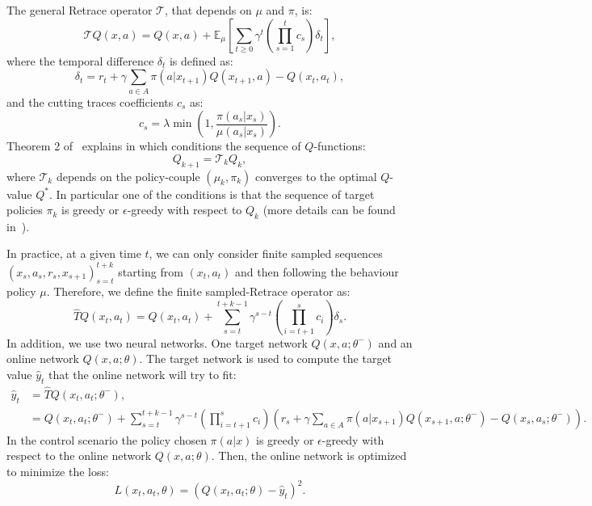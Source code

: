 \documentclass{article} %
\begin{document}
The general Retrace operator $\mathcal{T}$, that depends on $\mu$ and $\pi$, is:
\begin{equation}
\mathcal{T}Q(x,a) = Q(x,a) + \mathbb{E}_{\mu}\left[\sum_{t\geq0}\gamma^t\left(\prod_{s=1}^tc_s\right)\delta_t \right],
\end{equation}
where the temporal difference $\delta_t$ is defined as:
\begin{equation}
\delta_t = r_t + \gamma \sum_{a\in A}\pi(a|x_{t+1})Q(x_{t+1},a)-Q(x_t, a_t),    
\end{equation}
and the cutting traces coefficients $c_s$ as:
\begin{equation}
c_s = \lambda\min\left(1, \frac{\pi(a_s|x_s)}{\mu(a_s|x_s)}\right).    
\end{equation}
Theorem 2 of~\citet{munos2016safe} explains in which conditions the sequence of $Q$-functions:
\begin{equation}
    Q_{k+1} = \mathcal{T}_k Q_k,
\end{equation}
where $\mathcal{T}_k$ depends on the policy-couple $(\mu_k, \pi_k)$ converges to the optimal $Q$-value $Q^*$. In particular one of the conditions is that the sequence of target policies $\pi_k$ is greedy or $\epsilon$-greedy with respect to $Q_k$ (more details can be found in~\citet{munos2016safe}).

In practice, at a given time $t$, we can only consider finite sampled sequences $(x_s, a_s, r_s, x_{s+1})_{s=t}^{t+k}$ starting from $(x_t, a_t)$ and then following the behaviour policy $\mu$. Therefore, we define the finite sampled-Retrace operator as:
\begin{equation}
    \hat{T}Q(x_t, a_t) = Q(x_t, a_t) + \sum_{s=t}^{t+k-1}\gamma^{s-t}\left(\prod_{i=t+1}^s c_i\right)\delta_s.
\end{equation}
In addition, we use two neural networks. One target network $Q(x,a;\theta^-)$ and an online network $Q(x,a;\theta)$. The target network is used to compute the target value $\hat{y}_t$ that the online network will try to fit:
\begin{align}
\hat{y}_t &= \hat{T}Q(x_t, a_t; \theta^-),
\\
&= Q(x_t, a_t; \theta^-) + \sum_{s=t}^{t+k-1}\gamma^{s-t}\left(\prod_{i=t+1}^s c_i\right)\left(r_s + \gamma \sum_{a\in A}\pi(a|x_{s+1})Q(x_{s+1},a; \theta^-)-Q(x_s, a_s; \theta^-)\right).
\end{align}
In the control scenario the policy chosen $\pi(a|x)$ is greedy or $\epsilon$-greedy with respect to the online network $Q(x,a;\theta)$. Then, the online network is optimized to minimize the loss:
\begin{equation}
    L(x_t, a_t, \theta) = \left(Q(x_t,a_t;\theta)-\hat{y}_t\right)^2.
\end{equation}
\end{document}

